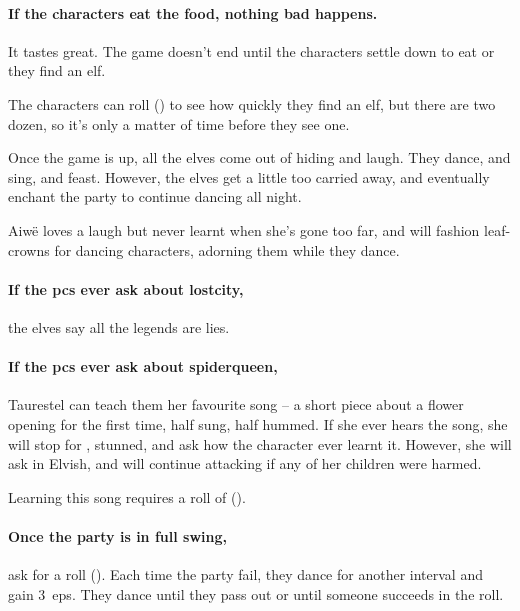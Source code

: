\paragraph{If the characters eat the food, nothing bad happens.}
It tastes great.
The game doesn't end until the characters settle down to eat or they find an elf.

The characters can roll  (\tn[8]) to see how quickly they find an elf, but there are two dozen, so it's only a matter of time before they see one.

Once the game is up, all the elves come out of hiding and laugh.
They dance, and sing, and feast.
However, the elves get a little too carried away, and eventually enchant the party to continue dancing all night.


Aiw\"{e} loves a laugh but never learnt when she's gone too far, and will fashion leaf-crowns for dancing characters, adorning them while they dance.


\showStdSpells


\paragraph{If the \glspl{pc} ever ask about \gls{lostcity},}
the elves say all the legends are lies.

\paragraph{If the \glspl{pc} ever ask about \gls{spiderqueen},}
Taurestel can teach them her favourite song -- a short piece about a flower opening for the first time, half sung, half hummed.
If she ever hears the song, she will stop for , stunned, and ask how the character ever learnt it.
However, she will ask in Elvish, and will continue attacking if any of her children were harmed.

Learning this song requires a roll of  (\tn[10]).

\paragraph{Once the party is in full swing,}
ask for a  roll (\tn[12]).
Each time the party fail, they dance for another \gls{interval} and gain 3~\glspl{ep}.
They dance until they pass out or until someone succeeds in the roll.

